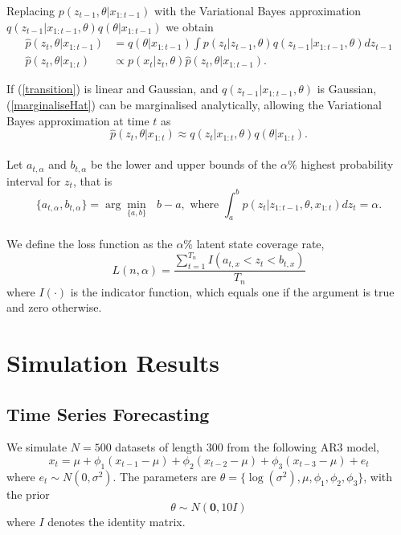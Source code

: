 \documentclass[12pt,a4paper]{article}\usepackage[]{graphicx}\usepackage[]{color}
\begin{document}
Replacing $p(z_{t-1}, \theta | x_{1:t-1})$ with the Variational Bayes approximation $q(z_{t-1} | x_{1:t-1}, \theta)q(\theta|x_{1:t-1})$ we obtain 
\begin{align}
\hat{p}(z_t, \theta | x_{1:t-1}) &= q(\theta | x_{1:t-1}) \int p(z_t | z_{t-1}, \theta) q(z_{t-1} | x_{1:t-1}, \theta)dz_{t-1} \label{marginaliseHat} \\
\hat{p}(z_t, \theta | x_{1:t}) &\propto p(x_t | z_t, \theta)\hat{p}(z_t, \theta | x_{1:t-1}). \label{updateHat}
\end{align}

If (\ref{transition}) is linear and Gaussian, and  $q(z_{t-1} | x_{1:t-1}, \theta)$ is Gaussian, (\ref{marginaliseHat}) can be marginalised analytically, allowing the Variational Bayes approximation at time $t$ as
\begin{equation}
\label{UVBfilter}
\hat{p}(z_t, \theta | x_{1:t}) \approx q(z_{t} | x_{1:t}, \theta)q(\theta|x_{1:t}).
\end{equation}
\\

Let $a_{t, \alpha}$ and $b_{t, \alpha}$ be the lower and upper bounds of the $\alpha\%$ highest probability interval for $z_t$, that is
\begin{equation}
\label{HPI}
\{a_{t, \alpha}, b_{t, \alpha}\} = \arg \underset{\{a, b\}}{\min}\mbox{ } b - a, \mbox{ where } \int_a^b p(z_t | z_{1:t-1}, \theta, x_{1:t})dz_t = \alpha.
\end{equation}
\\

We define the loss function as the $\alpha\%$ latent state coverage rate, 
\begin{equation}
\label{coverage}
L(n, \alpha) = \frac{\sum_{t=1}^{T_n} I(a_{t, x} < z_t < b_{t, x})}{T_n}
\end{equation}
where $I(\cdot)$ is the indicator function, which equals one if the argument is true and zero otherwise.

\section{Simulation Results}

\subsection{Time Series Forecasting}

We simulate $N = 500$ datasets of length $300$ from the following AR3 model,
\begin{equation}
\label{AR3}
x_t = \mu + \phi_1 (x_{t-1} - \mu) + \phi_2 (x_{t-2} - \mu) + \phi_3 (x_{t-3} - \mu) + e_t
\end{equation}
where $e_t \sim N(0, \sigma^2)$. 
The parameters are $\theta = \{\log(\sigma^2), \mu, \phi_1, \phi_2, \phi_3 \}$, with the prior
\begin{equation}
\label{prior}
\theta \sim N(\boldsymbol{0}, 10 I)
\end{equation}
where $I$ denotes the identity matrix.
\end{document}

